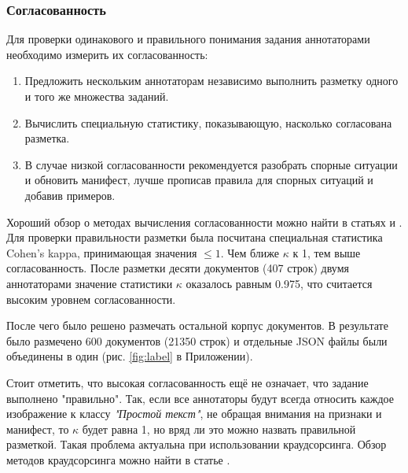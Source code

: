     \subsubsection{Согласованность}
        Для проверки одинакового и правильного понимания задания аннотаторами необходимо измерить их согласованность:
        \begin{enumerate}
            \item Предложить нескольким аннотаторам независимо выполнить разметку одного и того же множества заданий. 
            \item Вычислить специальную статистику, показывающую, насколько согласована разметка. 
            \item В случае низкой согласованности рекомендуется разобрать спорные ситуации и обновить манифест,
            лучше прописав правила для спорных ситуаций и добавив примеров. 
        \end{enumerate}
        Хороший обзор о методах вычисления согласованности можно найти в статьях
        \cite{artstein2008inter} и \cite{bayerl2011determines}.
        Для проверки правильности разметки была посчитана специальная статистика Cohen's kappa, принимающая значения $\leq 1$. Чем ближе $\kappa$ к 1, тем выше согласованность. После разметки десяти документов (407 строк) двумя аннотаторами значение статистики $\kappa$ оказалось равным 0.975, что считается высоким уровнем согласованности. 
        
        После чего было решено размечать остальной корпус документов. В результате было размечено 600 документов (21350 строк) и отдельные JSON файлы были объединены в один (рис. \ref{fig:label} в Приложении).
        
        Стоит отметить, что высокая согласованность ещё не означает, что задание выполнено "правильно".
        Так, если все аннотаторы будут всегда относить каждое изображение к классу \textit{"Простой текст"}, не обращая внимания на признаки и манифест, то 
        $\kappa$ будет равна 1, но вряд ли это можно назвать правильной разметкой. Такая проблема актуальна при
        использовании краудсорсинга. Обзор методов краудсорсинга можно найти в статье \cite{gilyzevTurdakov2018}. 